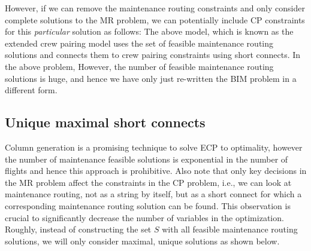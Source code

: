 \documentclass[letterpaper, 10pt, twocolumn, reqno]{amsart}
\begin{document}
However, if we can remove the maintenance routing constraints and only consider complete solutions to the MR problem, we can potentially include CP constraints for this \emph{particular} solution as follows:
The above model, which is known as the extended crew pairing model uses the set of feasible maintenance routing solutions and connects them to crew pairing constraints using short connects. In the above problem,
However, the number of feasible maintenance routing solutions is huge, and hence we have only just re-written the BIM problem in a different form.

\subsection{Unique maximal short connects}
\label{ssec:unique_maximal_sc}

Column generation is a promising technique to solve ECP to optimality, however the number of maintenance feasible solutions is exponential in the number of
flights and hence this approach is prohibitive. Also note that only key decisions in the MR problem affect the constraints in the CP problem, i.e., we
can look at maintenance routing, not as a string by itself, but as a short connect for which a corresponding maintenance routing solution can be found.
This observation is crucial to significantly decrease the number of variables in the optimization. Roughly, instead of constructing the set $S$ with all
feasible maintenance routing solutions, we will only consider maximal, unique solutions as shown below.
\end{document}
